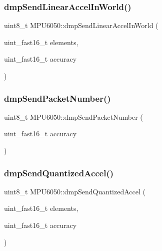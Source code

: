 \mbox{\label{classMPU6050_a05e012b160f512cb48e9c15d6b8abd60}} 
\subsubsection{\texorpdfstring{dmpSendLinearAccelInWorld()}{dmpSendLinearAccelInWorld()}}
{\footnotesize\ttfamily uint8\+\_\+t M\+P\+U6050\+::dmp\+Send\+Linear\+Accel\+In\+World (\begin{DoxyParamCaption}\item[{uint\+\_\+fast16\+\_\+t}]{elements,  }\item[{uint\+\_\+fast16\+\_\+t}]{accuracy }\end{DoxyParamCaption})}

\mbox{\label{classMPU6050_a92d59a9b70509fec913f86e3ba2788e1}} 
\subsubsection{\texorpdfstring{dmpSendPacketNumber()}{dmpSendPacketNumber()}}
{\footnotesize\ttfamily uint8\+\_\+t M\+P\+U6050\+::dmp\+Send\+Packet\+Number (\begin{DoxyParamCaption}\item[{uint\+\_\+fast16\+\_\+t}]{accuracy }\end{DoxyParamCaption})}

\mbox{\label{classMPU6050_a7383c4681b040cefc31d472362b7aeb2}} 
\subsubsection{\texorpdfstring{dmpSendQuantizedAccel()}{dmpSendQuantizedAccel()}}
{\footnotesize\ttfamily uint8\+\_\+t M\+P\+U6050\+::dmp\+Send\+Quantized\+Accel (\begin{DoxyParamCaption}\item[{uint\+\_\+fast16\+\_\+t}]{elements,  }\item[{uint\+\_\+fast16\+\_\+t}]{accuracy }\end{DoxyParamCaption})}

